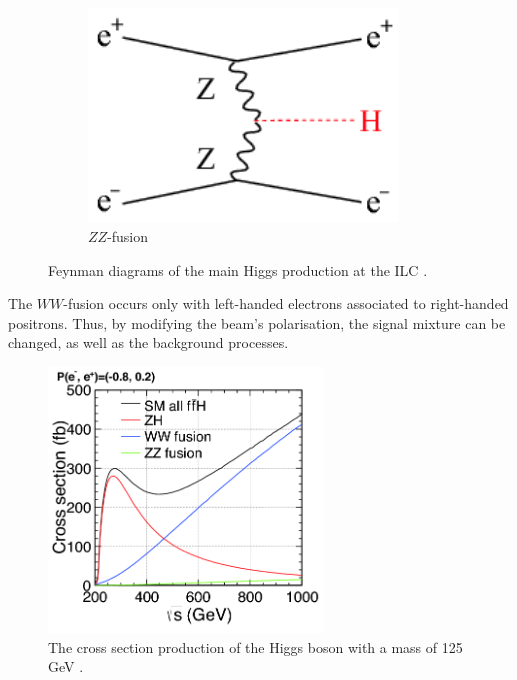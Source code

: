 \begin{figure}
\begin{subfigure}[t]{0.3\textwidth}
            \includegraphics[width = 0.9\textwidth]{Pictures/Higgs/HiggsProd_eeH.png}
            \caption{$ZZ$-fusion}
            \label{fig:ZZ-fusion}
        \end{subfigure}
        \caption{Feynman diagrams of the main Higgs production at the ILC \cite{Asner2013}\cite{tian}.}
        \label{fig:higgsProduction}
    \end{figure}    
    
    The $WW$-fusion occurs only with left-handed electrons associated to right-handed positrons.
    Thus, by modifying the beam's polarisation, the signal mixture can be changed, as well as the background processes.

    \begin{figure}[!h]
      \centering
      \includegraphics[width = 0.65\textwidth]{Pictures/Higgs/higgs_xsec_P-8_3.png}
      \caption{The cross section production of the Higgs boson with a mass of 125 GeV \cite{Asner2013}.}
      \label{fig:higgsXsec}
    \end{figure}

